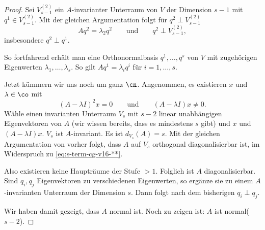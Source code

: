 \begin{proof}
Sei $V_{s-1}^{(2)}$ ein $A$-invarianter Unterraum von $V$ der Dimension $s-1$ mit
$q^1\in V_{s-1}^{(2)}$. Mit der gleichen Argumentation folgt f\"ur
$q^2\perp V_{s-1}^{(2)}$
\begin{equation*}
  Aq^2=\lambda_2q^2
  \qquad
  \text{und}
  \qquad
  q^2\perp V_{s-1}^{(2)},
\end{equation*}
insbesondere $q^2\perp q^1$.

So fortfahrend erh\"alt man eine Orthonormalbasis $q^1,\dots,q^s$ von $V$
mit zugeh\"origen Eigenwerten $\lambda_1,\dots,\lambda_s$. So gilt
$Aq^1=\lambda_iq^i$ f\"ur $i=1,\dots,s$.

Jetzt k\"ummern wir uns noch um ganz $\cn$. Angenommen, es existieren $x$
und $\lambda\in\co$ mit
\begin{equation}
  \label{eq:s-term-cg-v16-**}
  (A-\lambda I)^2x=0
  \qquad\text{und}\qquad
  (A-\lambda I)x\neq 0.
\end{equation}
W\"ahle einen invarianten Unterraum $V_s$ mit $s-2$ linear unabh\"angigen
Eigenvektoren von $A$ (wir wissen bereits, dass es mindestens $s$ gibt) und $x$ und $(A-\lambda I)x$. $V_s$ ist $A$-invariant.
Es ist $d_{V_s}(A)=s$. Mit der gleichen Argumentation von vorher folgt,
dass $A$ auf $V_s$ orthogonal diagonalisierbar ist, im Widerspruch zu
\eqref{eq:s-term-cg-v16-**}.

Also existieren keine Hauptr\"aume der Stufe ${}>1$. Folglich ist $A$
diagonalisierbar. Sind $q_i,q_j$ Eigenvektoren zu verschiedenen Eigenwerten,
so erg\"anze sie zu einem $A$-invarianten Unterraum der Dimension $s$.
Dann folgt nach dem bisherigen $q_i\perp q_j$.

\smallskip

Wir haben damit gezeigt, dass $A$ normal ist.
Noch zu zeigen ist: $A$ ist normal($s-2$).

\smallskip


\end{proof}
